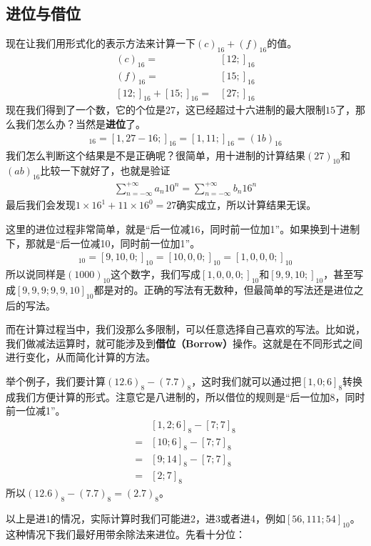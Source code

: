 \subsection*{进位与借位}
现在让我们用形式化的表示方法来计算一下$(c)_{16}+(f)_{16}$的值。
\begin{align*}
(c)_{16}={}&[12;]_{16}\\
(f)_{16}={}&[15;]_{16}\\
[12;]_{16}+[15;]_{16}={}&[27;]_{16}
\end{align*}
现在我们得到了一个数，它的个位是$27$，这已经超过十六进制的最大限制$15$了，那么我们怎么办？当然是\textbf{进位}了。
\begin{align*}
[27;]_{16}=[1,27-16;]_{16}=[1,11;]_{16}=(1b)_{16}
\end{align*}
我们怎么判断这个结果是不是正确呢？很简单，用十进制的计算结果$(27)_{10}$和$(ab)_{16}$比较一下就好了，也就是验证
\begin{align*}
\sum_{n=-\infty}^{+\infty}a_n10^n=\sum_{n=-\infty}^{+\infty}b_n16^n
\end{align*}
最后我们会发现$1\times16^1+11\times16^0=27$确实成立，所以计算结果无误。\par
这里的进位过程非常简单，就是``后一位减16，同时前一位加1''。如果换到十进制下，那就是``后一位减10，同时前一位加1''。
\begin{align*}
[9,9,10;]_{10}=[9,10,0;]_{10}=[10,0,0;]_{10}=[1,0,0,0;]_{10}
\end{align*}
所以说同样是$(1000)_{10}$这个数字，我们写成$[1,0,0,0;]_{10}$和$[9,9,10;]_{10}$，甚至写成$[9,9,9;9,9,10]_{10}$都是对的。正确的写法有无数种，但最简单的写法还是进位之后的写法。\par
而在计算过程当中，我们没那么多限制，可以任意选择自己喜欢的写法。比如说，我们做减法运算时，就可能涉及到\textbf{借位（Borrow）}操作。这就是在不同形式之间进行变化，从而简化计算的方法。\par
举个例子，我们要计算$(12.6)_8-(7.7)_8$，这时我们就可以通过把$[1,0;6]_8$转换成我们方便计算的形式。注意它是八进制的，所以借位的规则是``后一位加8，同时前一位减1''。
\begin{align*}
{}&[1,2;6]_8-[7;7]_8\\
={}&[10;6]_8-[7;7]_8\\
={}&[9;14]_8-[7;7]_8\\
={}&[2;7]_8
\end{align*}
所以$(12.6)_8-(7.7)_8=(2.7)_8$。\par
以上是进1的情况，实际计算时我们可能进2，进3或者进4，例如$[56,111;54]_{10}$。这种情况下我们最好用带余除法来进位。先看十分位：\par
